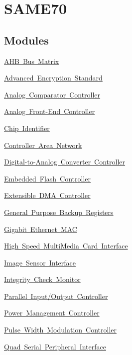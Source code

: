 \hypertarget{group__RTEMSBSPsARMAtsamContribE70}{}\section{S\+A\+M\+E70}
\label{group__RTEMSBSPsARMAtsamContribE70}
\subsection*{Modules}
\begin{DoxyCompactItemize}
\item 
\mbox{\hyperlink{group__SAME70__MATRIX}{A\+H\+B Bus Matrix}}
\item 
\mbox{\hyperlink{group__SAME70__AES}{Advanced Encryption Standard}}
\item 
\mbox{\hyperlink{group__SAME70__ACC}{Analog Comparator Controller}}
\item 
\mbox{\hyperlink{group__SAME70__AFEC}{Analog Front-\/\+End Controller}}
\item 
\mbox{\hyperlink{group__SAME70__CHIPID}{Chip Identifier}}
\item 
\mbox{\hyperlink{group__SAME70__MCAN}{Controller Area Network}}
\item 
\mbox{\hyperlink{group__SAME70__DACC}{Digital-\/to-\/\+Analog Converter Controller}}
\item 
\mbox{\hyperlink{group__SAME70__EFC}{Embedded Flash Controller}}
\item 
\mbox{\hyperlink{group__SAME70__XDMAC}{Extensible D\+M\+A Controller}}
\item 
\mbox{\hyperlink{group__SAME70__GPBR}{General Purpose Backup Registers}}
\item 
\mbox{\hyperlink{group__SAME70__GMAC}{Gigabit Ethernet M\+AC}}
\item 
\mbox{\hyperlink{group__SAME70__HSMCI}{High Speed Multi\+Media Card Interface}}
\item 
\mbox{\hyperlink{group__SAME70__ISI}{Image Sensor Interface}}
\item 
\mbox{\hyperlink{group__SAME70__ICM}{Integrity Check Monitor}}
\item 
\mbox{\hyperlink{group__SAME70__PIO}{Parallel Input/\+Output Controller}}
\item 
\mbox{\hyperlink{group__SAME70__PMC}{Power Management Controller}}
\item 
\mbox{\hyperlink{group__SAME70__PWM}{Pulse Width Modulation Controller}}
\item 
\mbox{\hyperlink{group__SAME70__QSPI}{Quad Serial Peripheral Interface}}

\end{DoxyCompactItemize}
